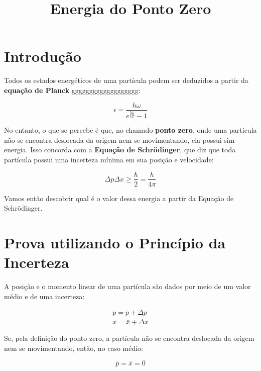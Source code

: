 
\title{Energia do Ponto Zero}


\maketitle

\section{Introdução}

Todos os estados energéticos de uma partícula podem ser deduzidos a partir da \textbf{equação de Planck} ggggggggggggggggggg:

\begin{equation}
    \epsilon = \frac{h\omega}{e^{\frac{h\omega}{kT}} - 1}
    \label{eq1}
\end{equation}

No entanto, o que se percebe é que, no chamado \textbf{ponto zero}, onde uma partícula não se encontra deslocada da origem nem se movimentando, ela possui sim energia. Isso concorda com a \textbf{Equação de Schr\"odinger}, que diz que toda partícula possui uma incerteza mínima em sua posição e velocidade:

\begin{equation}
    \Delta p \Delta x \geq \frac{\hbar}{2} = \frac{h}{4\pi}
    \label{eq2}
\end{equation}

Vamos então descobrir qual é o valor dessa energia a partir da Equação de Schr\"odinger.

\section{Prova utilizando o Princípio da Incerteza}

A posição e o momento linear de uma partícula são dados por meio de um valor médio e de uma incerteza:

\begin{eqnarray}
    p = \bar{p} + \Delta p  \label{eq3} \\
    x = \bar{x} + \Delta x  \label{eq4}
\end{eqnarray}

Se, pela definição do ponto zero, a partícula não se encontra deslocada da origem nem se movimentando, então, no caso médio:

\begin{equation}
    \bar{p} = \bar{x} = 0   \label{eq5}
\end{equation}

